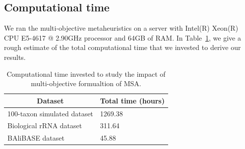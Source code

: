 \clearpage
\subsection{Computational time}
We ran the multi-objective metaheuristics on a server with Intel(R) Xeon(R) CPU E5-4617 @ 2.90GHz processor and 64GB of RAM. In Table~\ref{tab:time}, we give a rough estimate of the total computational time that we invested to derive our results.

\begin{table}[htbp]
	\small
	\centering
	\caption{Computational time invested to study the impact of multi-objective formualtion of MSA.}
	\begin{tabular}{|l|l|}
		\hline 
		\multicolumn{1}{|c|}{Dataset} & \multicolumn{1}{c|}{Total time (hours)} \\ 
		\hline 
		100-taxon simulated dataset &  1269.38\\ 
		\hline 
		Biological rRNA dataset &  311.64\\ 
		\hline 
		BAliBASE dataset &  45.88\\ 
		\hline 
	\end{tabular} 
	\label{tab:time}%
\end{table}%

